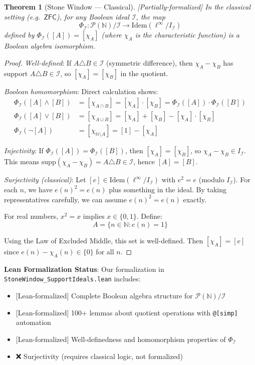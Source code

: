 \documentclass[11pt]{article}
\theoremstyle{plain}
\newtheorem{theorem}{Theorem}[section]
\theoremstyle{definition}
\newcommand{\N}{\mathbb{N}}
\newcommand{\ZFC}{\mathsf{ZFC}}
\newcommand{\linf}{\ell^\infty}
\newcommand{\leanok}{\textsf{\textcolor{green!70!black}{[Lean-formalized]}}}
\newcommand{\leanpartial}{\textsf{\textcolor{purple!70!black}{[Partially-formalized]}}}
\begin{document}
\begin{theorem}[Stone Window — Classical]\label{thm:stone-classical} \leanpartial
In the classical setting (e.g.\ $\ZFC$), for any Boolean ideal $\mathcal{I}$, the map
\[
\Phi_{\mathcal{I}}: \mathcal{P}(\N)/\mathcal{I} \to \text{Idem}(\linf/I_{\mathcal{I}})
\]
defined by $\Phi_{\mathcal{I}}([A]) = [\chi_A]$ (where $\chi_A$ is the characteristic function) is a Boolean algebra isomorphism.
\end{theorem}

\begin{proof}
\emph{Well-defined}: If $A \triangle B \in \mathcal{I}$ (symmetric difference), then $\chi_A - \chi_B$ has support $A \triangle B \in \mathcal{I}$, so $[\chi_A] = [\chi_B]$ in the quotient.

\emph{Boolean homomorphism}: Direct calculation shows:
\begin{align}
\Phi_{\mathcal{I}}([A] \wedge [B]) &= [\chi_{A \cap B}] = [\chi_A] \cdot [\chi_B] = \Phi_{\mathcal{I}}([A]) \cdot \Phi_{\mathcal{I}}([B])\\
\Phi_{\mathcal{I}}([A] \vee [B]) &= [\chi_{A \cup B}] = [\chi_A] + [\chi_B] - [\chi_A] \cdot [\chi_B]\\
\Phi_{\mathcal{I}}(\neg[A]) &= [\chi_{\N \setminus A}] = [1] - [\chi_A]
\end{align}

\emph{Injectivity}: If $\Phi_{\mathcal{I}}([A]) = \Phi_{\mathcal{I}}([B])$, then $[\chi_A] = [\chi_B]$, so $\chi_A - \chi_B \in I_{\mathcal{I}}$. This means $\text{supp}(\chi_A - \chi_B) = A \triangle B \in \mathcal{I}$, hence $[A] = [B]$.

\emph{Surjectivity (classical)}: Let $[e] \in \text{Idem}(\linf/I_{\mathcal{I}})$ with $e^2 = e$ (modulo $I_{\mathcal{I}}$). For each $n$, we have $e(n)^2 = e(n)$ plus something in the ideal. By taking representatives carefully, we can assume $e(n)^2 = e(n)$ exactly.

For real numbers, $x^2 = x$ implies $x \in \{0, 1\}$. Define:
\[
A = \{n \in \N : e(n) = 1\}
\]

Using the Law of Excluded Middle, this set is well-defined. Then $[\chi_A] = [e]$ since $e(n) - \chi_A(n) \in \{0\}$ for all $n$.
\end{proof}

\begin{formalbox}
\textbf{Lean Formalization Status}: Our formalization in \texttt{StoneWindow\_SupportIdeals.lean} includes:
\begin{itemize}
\item \leanok{} Complete Boolean algebra structure for $\mathcal{P}(\N)/\mathcal{I}$
\item \leanok{} 100+ lemmas about quotient operations with \texttt{@[simp]} automation
\item \leanok{} Well-definedness and homomorphism properties of $\Phi_{\mathcal{I}}$
\item ❌ Surjectivity (requires classical logic, not formalized)
\end{itemize}
\end{formalbox}
\end{document}
